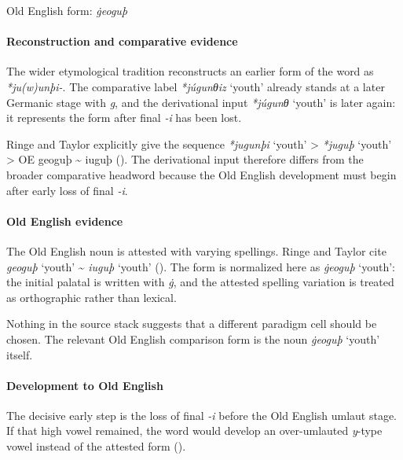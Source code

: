 \documentclass[
  british,
  a4paper,
]{article}
\providecommand{\Recon}[1]{\emph{*#1}}
\begin{document}
Old English form: \emph{ġeoguþ}

\paragraph{Reconstruction and comparative
evidence}\label{reconstruction-and-comparative-evidence-123}

The wider etymological tradition reconstructs an earlier form of the
word as {\emph{*ju(w)unþi-}}. The comparative label \Recon{júgunθiz}
`youth' already stands at a later Germanic stage with \emph{g}, and the
derivational input \Recon{júgunθ} `youth' is later again: it represents
the form after final \emph{-i} has been lost.

Ringe and Taylor explicitly give the sequence \Recon{jugunþi} `youth'
\textgreater{} \Recon{juguþ} `youth' \textgreater{} OE geoguþ
\textasciitilde{} iuguþ (). The derivational input therefore differs from the broader
comparative headword because the Old English development must begin
after early loss of final \emph{-i}.

\paragraph{Old English evidence}\label{old-english-evidence-125}

The Old English noun is attested with varying spellings. Ringe and
Taylor cite {\emph{geoguþ}} `youth' \textasciitilde{} {\emph{iuguþ}}
`youth' ().
The form is normalized here as {\emph{ġeoguþ}} `youth': the initial
palatal is written with \emph{ġ}, and the attested spelling variation is
treated as orthographic rather than lexical.

Nothing in the source stack suggests that a different paradigm cell
should be chosen. The relevant Old English comparison form is the noun
{\emph{ġeoguþ}} `youth' itself.

\paragraph{Development to Old
English}\label{development-to-old-english-123}

The decisive early step is the loss of final \emph{-i} before the Old
English umlaut stage. If that high vowel remained, the word would
develop an over-umlauted \emph{y}-type vowel instead of the attested
form ().
\end{document}

